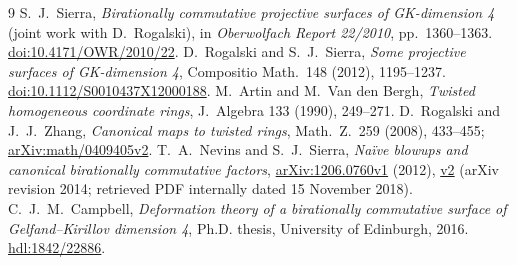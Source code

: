 \documentclass[11pt]{article}
\begin{document}
\begin{thebibliography}{9}
S.~J.~Sierra, \emph{Birationally commutative projective surfaces of
GK-dimension 4} (joint work with D.~Rogalski), in
\emph{Oberwolfach Report 22/2010},
pp.~1360--1363.
\href{https://doi.org/10.4171/OWR/2010/22}{doi:10.4171/OWR/2010/22}.
D.~Rogalski and S.~J.~Sierra,
\emph{Some projective surfaces of GK-dimension 4},
Compositio Math.~148 (2012), 1195--1237.
\href{https://doi.org/10.1112/S0010437X12000188}{doi:10.1112/S0010437X12000188}.
M.~Artin and M.~Van den Bergh,
\emph{Twisted homogeneous coordinate rings},
J.~Algebra 133 (1990), 249--271.
D.~Rogalski and J.~J.~Zhang,
\emph{Canonical maps to twisted rings},
Math.~Z.~259 (2008), 433--455;
\href{https://arxiv.org/abs/math/0409405v2}{arXiv:math/0409405v2}.
T.~A.~Nevins and S.~J.~Sierra,
\emph{Na\"ive blowups and canonical birationally commutative factors},
\href{https://arxiv.org/abs/1206.0760v1}{arXiv:1206.0760v1} (2012),
\href{https://arxiv.org/abs/1206.0760v2}{v2} (arXiv revision 2014;
retrieved PDF internally dated 15 November 2018).
C.~J.~M.~Campbell,
\emph{Deformation theory of a birationally commutative surface of
Gelfand--Kirillov dimension 4}, Ph.D. thesis, University of Edinburgh,
2016. \href{https://hdl.handle.net/1842/22886}{hdl:1842/22886}.
\end{thebibliography}
\end{document}
